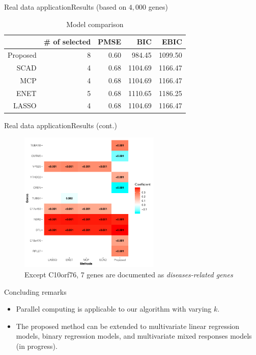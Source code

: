 \documentclass[citecolor=blue,10pt]{beamer}
\newcommand{\0} {\mbox{\boldmath$0$}}
\begin{document}
\begin{frame}{Real data application}{Results (based on $4,000$ genes)}
\begin{table}[ht]
 \centering
 \caption{Model comparison}\label{T:realdata}
 \begin{tabular}{rrrrr}
  \hline
           & \# of selected  & PMSE & BIC     & EBIC    \\
  \hline
  Proposed & 8 & 0.60      & 984.45  & 1099.50 \\
  SCAD     & 4 & 0.68      & 1104.69 & 1166.47 \\
  MCP      & 4 & 0.68      & 1104.69 & 1166.47 \\
  ENET     & 5 & 0.68      & 1110.65 & 1186.25 \\
  LASSO    & 4 & 0.68      & 1104.69 & 1166.47 \\
  \hline
 \end{tabular}
\end{table}
\end{frame}
\begin{frame}{Real data application}{Results (cont.)}
\begin{figure}
 \centering
 \includegraphics[width=0.6\textwidth,height=0.55\textwidth]{Heatmap.pdf}
 \caption{Except C10orf76, 7 genes are documented as \emph{diseases-related genes} }
\end{figure}

\end{frame}


\begin{frame}{Concluding remarks}
\begin{itemize}\itemsep=4mm
\item Parallel computing is applicable to our algorithm with varying $k$. 
\item The proposed method can be extended to multivariate linear regression models, binary regression models, and multivariate mixed responses models (in progress).
\end{itemize}

\end{frame}
\end{document}
